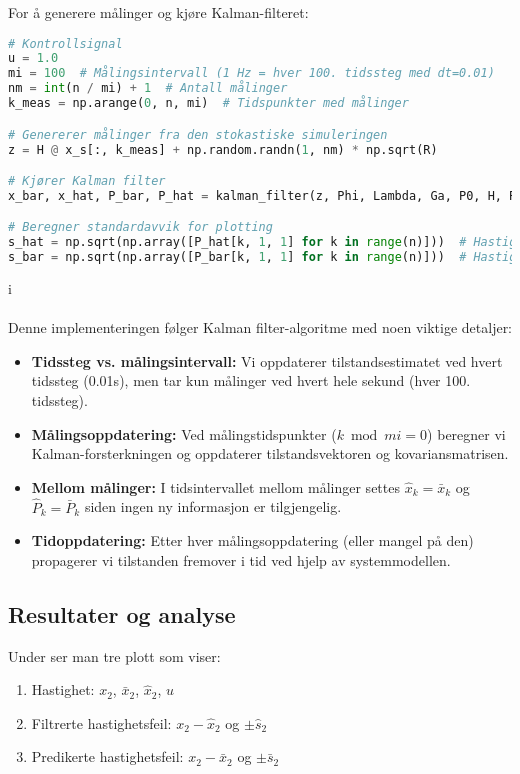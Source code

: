 \documentclass[a4paper,12pt]{article}
\theoremstyle{plain}
\begin{document}
For å generere målinger og kjøre Kalman-filteret:

\begin{lstlisting}[language=Python, caption=Generering av målinger og kjøring av Kalman filter]
# Kontrollsignal
u = 1.0
mi = 100  # Målingsintervall (1 Hz = hver 100. tidssteg med dt=0.01)
nm = int(n / mi) + 1  # Antall målinger
k_meas = np.arange(0, n, mi)  # Tidspunkter med målinger

# Genererer målinger fra den stokastiske simuleringen
z = H @ x_s[:, k_meas] + np.random.randn(1, nm) * np.sqrt(R)

# Kjører Kalman filter
x_bar, x_hat, P_bar, P_hat = kalman_filter(z, Phi, Lambda, Ga, P0, H, R, mi, u, n)

# Beregner standardavvik for plotting
s_hat = np.sqrt(np.array([P_hat[k, 1, 1] for k in range(n)]))  # Hastighets std.avvik (posteriori)
s_bar = np.sqrt(np.array([P_bar[k, 1, 1] for k in range(n)]))  # Hastighets std.avvik (priori)
\end{lstlisting}
i 
\\\\
Denne implementeringen følger Kalman filter-algoritme med noen viktige detaljer:

\begin{itemize}
    \item \textbf{Tidssteg vs. målingsintervall:} Vi oppdaterer tilstandsestimatet ved hvert tidssteg (0.01s), men tar kun målinger ved hvert hele sekund (hver 100. tidssteg).
    \item \textbf{Målingsoppdatering:} Ved målingstidspunkter ($k \bmod mi = 0$) beregner vi Kalman-forsterkningen og oppdaterer tilstandsvektoren og kovariansmatrisen.
    \item \textbf{Mellom målinger:} I tidsintervallet mellom målinger settes $\hat{x}_k = \bar{x}_k$ og $\hat{P}_k = \bar{P}_k$ siden ingen ny informasjon er tilgjengelig.
    \item \textbf{Tidoppdatering:} Etter hver målingsoppdatering (eller mangel på den) propagerer vi tilstanden fremover i tid ved hjelp av systemmodellen.
\end{itemize}

\clearpage
\subsection{Resultater og analyse}

Under ser man tre plott som viser:
\begin{enumerate}
    \item Hastighet: $x_2$, $\bar{x}_2$, $\hat{x}_2$, $u$
    \item Filtrerte hastighetsfeil: $x_2 - \hat{x}_2$ og $\pm\hat{s}_2$
    \item Predikerte hastighetsfeil: $x_2 - \bar{x}_2$ og $\pm\bar{s}_2$
\end{enumerate}
\end{document}
